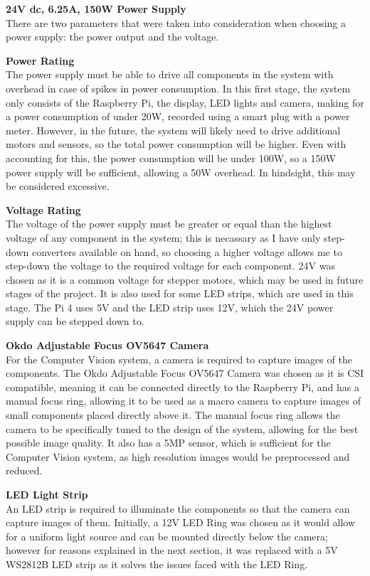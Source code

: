 \vspace{1em}
\noindent
\textbf{24V dc, 6.25A, 150W Power Supply} \\
There are two parameters that were taken into consideration when choosing a power supply: the power output and the voltage.
\begin{mylist}
  \item \textbf{Power Rating} \\
  The power supply must be able to drive all components in the system with overhead in case of spikes in power consumption.
  In this first stage, the system only consists of the Raspberry Pi, the display, LED lights and camera, 
  making for a power consumption of under 20W, recorded using a smart plug with a power meter.
  However, in the future, the system will likely need to drive additional motors and sensors, so the total power consumption
  will be higher. Even with accounting for this, the power consumption will be under 100W, so a 150W power supply will be sufficient,
  allowing a 50W overhead. In hindsight, this may be considered excessive.
  \item \textbf{Voltage Rating} \\
  The voltage of the power supply must be greater or equal than the highest voltage of any component in the system; this is necassary
  as I have only step-down converters available on hand, so choosing a higher voltage allows me to step-down the voltage 
  to the required voltage for each component. 24V was chosen as it is a common voltage for stepper motors, which may be used in
  future stages of the project. It is also used for some LED strips, which are used in this stage. The Pi 4 uses 5V and the LED strip
  uses 12V, which the 24V power supply can be stepped down to.
\end{mylist}

\noindent
\textbf{Okdo Adjustable Focus OV5647 Camera} \\
For the Computer Vision system, a camera is required to capture images of the components. The Okdo Adjustable Focus OV5647 Camera
was chosen as it is CSI compatible, meaning it can be connected directly to the Raspberry Pi, and has a manual focus ring, allowing
it to be used as a macro camera to capture images of small components placed directly above it. The manual focus ring allows the camera
to be specifically tuned to the design of the system, allowing for the best possible image quality. It also
has a 5MP sensor\cite{okdospec}, which is sufficient for the Computer Vision system, as high resolution images would be preprocessed and reduced.

\vspace{1em}
\noindent
\textbf{LED Light Strip} \\
An LED strip is required to illuminate the components so that the camera can capture images of them.
Initially, a 12V LED Ring was chosen as it would allow for a uniform light source and can be mounted directly below the camera; 
however for reasons explained in the next section, it was replaced with a 5V WS2812B LED strip as it solves the issues
faced with the LED Ring.